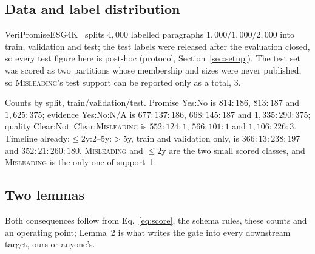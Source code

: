 \subsection{Data and label distribution}
\label{sec:data}

VeriPromiseESG4K~\cite{day2026veripromiseesg4k} splits $4{,}000$ labelled paragraphs
$1{,}000/1{,}000/2{,}000$ into train, validation and test; the test labels were released after the
evaluation closed, so every test figure here is post-hoc (protocol,
Section~\ref{sec:setup}). The test set was scored as two partitions whose membership and sizes
were never published, so \textsc{Misleading}'s test support can be reported only as a total, 3.

Counts by split, train/validation/test. Promise Yes:No is $814{:}186$, $813{:}187$ and
$1{,}625{:}375$; evidence Yes:No:N/A is $677{:}137{:}186$, $668{:}145{:}187$ and
$1{,}335{:}290{:}375$; quality Clear:Not~Clear:\textsc{Misleading} is $552{:}124{:}1$,
$566{:}101{:}1$ and $1{,}106{:}226{:}3$. Timeline already:${\le}2$y:2--5y:${>}5$y, train and
validation only, is $366{:}13{:}238{:}197$ and $352{:}21{:}260{:}180$. \textsc{Misleading} and
${\le}2$y are the two small scored classes, and \textsc{Misleading} is the only one of support~1.

\subsection{Two lemmas}
\label{sec:lemma}

Both consequences follow from Eq.~\eqref{eq:score}, the
schema rules, these counts and an operating point; Lemma~2 is what writes the gate into every
downstream target, ours or anyone's.

